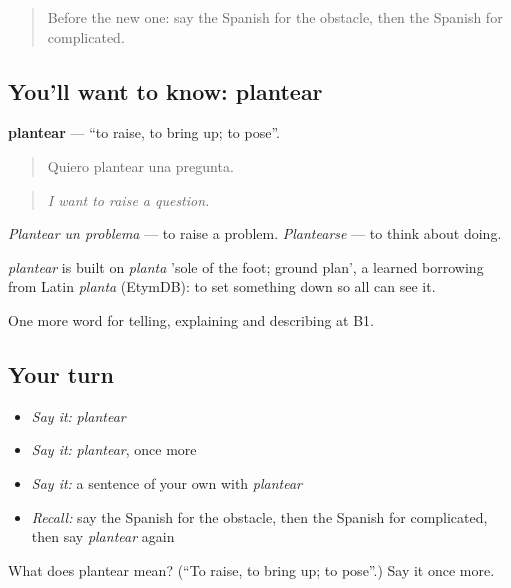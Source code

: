 \label{lesson:ES-C620-plantear}



\begin{quote}
Before the new one: say the Spanish for the obstacle, then the Spanish for complicated.
\end{quote}

\subsection*{You'll want to know: plantear}
\textbf{plantear} — \textquotedblleft{}to raise, to bring up; to pose\textquotedblright{}.

\begin{quote}
Quiero plantear una pregunta.
\end{quote}

\begin{quote}
\emph{I want to raise a question.}
\end{quote}

\emph{Plantear un problema} — to raise a problem. \emph{Plantearse} — to think about doing.

\begin{cousinweb}
\emph{plantear} is built on \emph{planta} 'sole of the foot; ground plan', a learned borrowing from Latin \emph{planta} (EtymDB): to set something down so all can see it.
\end{cousinweb}

\begin{grammarlens}[title={What you've built}]
One more word for telling, explaining and describing at B1.
\end{grammarlens}

\subsection*{Your turn}
\begin{itemize}
\raggedright
  \item \emph{Say it:} \emph{plantear}
  \item \emph{Say it:} \emph{plantear}, once more
  \item \emph{Say it:} a sentence of your own with \emph{plantear}
  \item \emph{Recall:} say the Spanish for the obstacle, then the Spanish for complicated, then say \emph{plantear} again
\end{itemize}

\begin{tcolorbox}[breakable,colback=teal!4,colframe=teal!35!black,title={Before you move on}]
What does plantear mean? (\textquotedblleft{}To raise, to bring up; to pose\textquotedblright{}.) Say it once more.
\end{tcolorbox}
